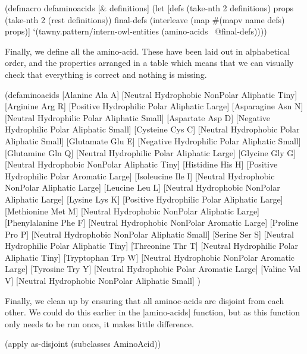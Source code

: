 \begin{tawny}
(defmacro defaminoacids
  [& definitions]
  (let [defs (take-nth 2 definitions)
        props (take-nth 2 (rest definitions))
        final-defs
        (interleave
         (map
          #(mapv name %
          defs)
         props)]
    `(tawny.pattern/intern-owl-entities
      (amino-acids ~@final-defs))))
\end{tawny}

Finally, we define all the amino-acid. These have been laid out in
alphabetical order, and the properties arranged in a table which means that we
can visually check that everything is correct and nothing is missing.


\begin{tawny}
(defaminoacids
  [Alanine       Ala A] [Neutral  Hydrophobic NonPolar Aliphatic Tiny]
  [Arginine      Arg R] [Positive Hydrophilic Polar    Aliphatic Large]
  [Asparagine    Asn N] [Neutral  Hydrophilic Polar    Aliphatic Small]
  [Aspartate     Asp D] [Negative Hydrophilic Polar    Aliphatic Small]
  [Cysteine      Cys C] [Neutral  Hydrophobic Polar    Aliphatic Small]
  [Glutamate     Glu E] [Negative Hydrophilic Polar    Aliphatic Small]
  [Glutamine     Gln Q] [Neutral  Hydrophilic Polar    Aliphatic Large]
  [Glycine       Gly G] [Neutral  Hydrophobic NonPolar Aliphatic Tiny]
  [Histidine     His H] [Positive Hydrophilic Polar    Aromatic  Large]
  [Isoleucine    Ile I] [Neutral  Hydrophobic NonPolar Aliphatic Large]
  [Leucine       Leu L] [Neutral  Hydrophobic NonPolar Aliphatic Large]
  [Lysine        Lys K] [Positive Hydrophilic Polar    Aliphatic Large]
  [Methionine    Met M] [Neutral  Hydrophobic NonPolar Aliphatic Large]
  [Phenylalanine Phe F] [Neutral  Hydrophobic NonPolar Aromatic  Large]
  [Proline       Pro P] [Neutral  Hydrophobic NonPolar Aliphatic Small]
  [Serine        Ser S] [Neutral  Hydrophilic Polar    Aliphatic Tiny]
  [Threonine     Thr T] [Neutral  Hydrophilic Polar    Aliphatic Tiny]
  [Tryptophan    Trp W] [Neutral  Hydrophobic NonPolar Aromatic  Large]
  [Tyrosine      Try Y] [Neutral  Hydrophobic Polar    Aromatic  Large]
  [Valine        Val V] [Neutral  Hydrophobic NonPolar Aliphatic Small]
  )
\end{tawny}

Finally, we clean up by ensuring that all aminoc-acids are disjoint from each
other. We could do this earlier in the |amino-acids| function, but as this
function only needs to be run once, it makes little difference.

\begin{tawny}
(apply as-disjoint (subclasses AminoAcid))
\end{tawny}

